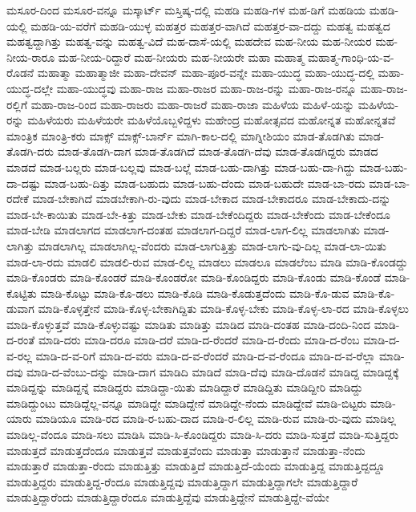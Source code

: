 {ಮಸೂರ-ದಿಂದ
ಮಸೂರ-ವನ್ನೂ
ಮಸ್ಕಾರ್ಟ್
ಮಸ್ತಿಷ್ಕ-ದಲ್ಲಿ
ಮಹಡಿ
ಮಹಡಿ-ಗಳ
ಮಹ-ಡಿಗೆ
ಮಹಡಿಯ
ಮಹಡಿ-ಯಲ್ಲಿ
ಮಹಡಿ-ಯ-ವರೆಗೆ
ಮಹಡಿ-ಯುಳ್ಳ
ಮಹತ್ತರ
ಮಹತ್ತರ-ವಾಗಿದೆ
ಮಹತ್ತರ-ವಾ-ದದ್ದು
ಮಹತ್ವ
ಮಹತ್ವದ
ಮಹತ್ವದ್ದಾಗಿತ್ತು
ಮಹತ್ವ-ವನ್ನು
ಮಹತ್ವ-ವಿದೆ
ಮಹ-ದಾಸೆ-ಯಲ್ಲಿ
ಮಹದೇವ
ಮಹ-ನೀಯ
ಮಹ-ನೀಯರ
ಮಹ-ನೀಯ-ರಾರೂ
ಮಹ-ನೀಯ-ರಿದ್ದಾರೆ
ಮಹ-ನೀಯರು
ಮಹ-ನೀಯರೇ
ಮಹಾ
ಮಹಾತ್ಮ
ಮಹಾತ್ಮ-ಗಾಂಧಿ-ಯ-ವ-ರೊಡನೆ
ಮಹಾತ್ಮಾ
ಮಹಾತ್ಮಾಜೀ
ಮಹಾ-ದೇವನ್
ಮಹಾ-ಪೂರ-ವನ್ನೇ
ಮಹಾ-ಯುದ್ಧ
ಮಹಾ-ಯುದ್ಧ-ದಲ್ಲಿ
ಮಹಾ-ಯುದ್ಧ-ದಲ್ಲೇ
ಮಹಾ-ಯುದ್ಧವು
ಮಹಾ-ರಾಜ
ಮಹಾ-ರಾಜರ
ಮಹಾ-ರಾಜ-ರನ್ನು
ಮಹಾ-ರಾಜ-ರನ್ನೂ
ಮಹಾ-ರಾಜ-ರಲ್ಲಿಗೆ
ಮಹಾ-ರಾಜ-ರಿಂದ
ಮಹಾ-ರಾಜರು
ಮಹಾ-ರಾಜರೆ
ಮಹಾ-ರಾಜಾ
ಮಹಿಳೆಯ
ಮಹಿಳೆ-ಯನ್ನು
ಮಹಿಳೆಯ-ರನ್ನು
ಮಹಿಳೆಯರು
ಮಹಿಳೆಯರೇ
ಮಹಿಳೆಯೊಬ್ಬಳಿದ್ದಳು
ಮಹೇಂದ್ರ
ಮಹೋತ್ಸವದ
ಮಹೋನ್ನತ
ಮಹೋನ್ನತವೆ
ಮಾಂತ್ರಿಕ
ಮಾಂತ್ರಿ-ಕರು
ಮಾಕ್ಸ್
ಮಾಕ್ಸ್-ಬಾರ್ನ್
ಮಾಗಿ-ಕಾಲ-ದಲ್ಲಿ
ಮಾಗ್ನೀಶಿಯಂ
ಮಾಡ-ತೊಡಗಿತು
ಮಾಡ-ತೊಡಗಿ-ದರು
ಮಾಡ-ತೊಡಗಿ-ದಾಗ
ಮಾಡ-ತೊಡಗಿದೆ
ಮಾಡ-ತೊಡಗಿ-ದೆವು
ಮಾಡ-ತೊಡಗಿದ್ದರು
ಮಾಡದ
ಮಾಡದೆ
ಮಾಡ-ಬಲ್ಲರು
ಮಾಡ-ಬಲ್ಲವು
ಮಾಡ-ಬಲ್ಲೆ
ಮಾಡ-ಬಹು-ದಾಗಿತ್ತು
ಮಾಡ-ಬಹು-ದಾ-ಗಿದ್ದು
ಮಾಡ-ಬಹು-ದಾ-ದಷ್ಟು
ಮಾಡ-ಬಹು-ದಿತ್ತು
ಮಾಡ-ಬಹುದು
ಮಾಡ-ಬಹು-ದೆಂದು
ಮಾಡ-ಬಹುದೇ
ಮಾಡ-ಬಾ-ರದು
ಮಾಡ-ಬಾ-ರದೇಕೆ
ಮಾಡ-ಬೇಕಾಗಿದೆ
ಮಾಡಬೇಕಾಗಿ-ರು-ವುದು
ಮಾಡ-ಬೇಕಾದ
ಮಾಡ-ಬೇಕಾದರೂ
ಮಾಡ-ಬೇಕಾದು-ದನ್ನು
ಮಾಡ-ಬೇ-ಕಾಯಿತು
ಮಾಡ-ಬೇ-ಕಿತ್ತು
ಮಾಡ-ಬೇಕು
ಮಾಡ-ಬೇಕೆಂದಿದ್ದರು
ಮಾಡ-ಬೇಕೆಂದು
ಮಾಡ-ಬೇಕೆಂದೂ
ಮಾಡ-ಬೇಡಿ
ಮಾಡಲಾಗದ
ಮಾಡಲಾಗ-ದಂತಹ
ಮಾಡಲಾಗ-ದಿದ್ದರೆ
ಮಾಡ-ಲಾಗ-ಲಿಲ್ಲ
ಮಾಡಲಾಗಿತು
ಮಾಡ-ಲಾಗಿತ್ತು
ಮಾಡಲಾಗಿಲ್ಲ
ಮಾಡಲಾಗಿಲ್ಲ-ವೆಂದರು
ಮಾಡ-ಲಾಗುತ್ತಿತ್ತು
ಮಾಡ-ಲಾಗು-ವು-ದಿಲ್ಲ
ಮಾಡ-ಲಾ-ಯಿತು
ಮಾಡ-ಲಾ-ರದು
ಮಾಡಲಿ
ಮಾಡಲಿ-ರುವ
ಮಾಡ-ಲಿಲ್ಲ
ಮಾಡಲು
ಮಾಡಲೂ
ಮಾಡಲೆಂಬ
ಮಾಡಿ
ಮಾಡಿ-ಕೊಂಡದ್ದು
ಮಾಡಿ-ಕೊಂಡರು
ಮಾಡಿ-ಕೊಂಡರೆ
ಮಾಡಿ-ಕೊಂಡರೋ
ಮಾಡಿ-ಕೊಂಡಿದ್ದರು
ಮಾಡಿ-ಕೊಂಡು
ಮಾಡಿ-ಕೊಂಡೆ
ಮಾಡಿ-ಕೊಟ್ಟಿತು
ಮಾಡಿ-ಕೊಟ್ಟು
ಮಾಡಿ-ಕೊ-ಡಲು
ಮಾಡಿ-ಕೊಡಿ
ಮಾಡಿ-ಕೊಡುತ್ತದೆಂದು
ಮಾಡಿ-ಕೊ-ಡುವ
ಮಾಡಿ-ಕೊ-ಡುವಾಗ
ಮಾಡಿ-ಕೊಳ್ಳತ್ತೇನೆ
ಮಾಡಿ-ಕೊಳ್ಳ-ಬೇಕಾಗಿದ್ದಿತು
ಮಾಡಿ-ಕೊಳ್ಳ-ಬೇಕು
ಮಾಡಿ-ಕೊಳ್ಳ-ಲಾ-ರದ
ಮಾಡಿ-ಕೊಳ್ಳಲು
ಮಾಡಿ-ಕೊಳ್ಳುತ್ತವೆ
ಮಾಡಿ-ಕೊಳ್ಳುವಷ್ಟು
ಮಾಡಿತು
ಮಾಡಿತ್ತು
ಮಾಡಿದ
ಮಾಡಿ-ದಂತಹ
ಮಾಡಿ-ದಂದಿ-ನಿಂದ
ಮಾಡಿ-ದ-ರಂತೆ
ಮಾಡಿ-ದರು
ಮಾಡಿ-ದರೂ
ಮಾಡಿ-ದರೆ
ಮಾಡಿ-ದ-ರೆಂದರೆ
ಮಾಡಿ-ದ-ರೆಂದು
ಮಾಡಿ-ದ-ರೆಂಬ
ಮಾಡಿ-ದ-ವ-ರಲ್ಲ
ಮಾಡಿ-ದ-ವ-ರಿಗೆ
ಮಾಡಿ-ದ-ವರು
ಮಾಡಿ-ದ-ವ-ರೆಂದರೆ
ಮಾಡಿ-ದ-ವ-ರೆಂದೂ
ಮಾಡಿ-ದ-ವ-ರೆಲ್ಲಾ
ಮಾಡಿ-ದವು
ಮಾಡಿ-ದ-ವೆಂಬು-ದನ್ನು
ಮಾಡಿ-ದಾಗ
ಮಾಡಿದಿ
ಮಾಡಿದೆ
ಮಾಡಿ-ದೆವು
ಮಾಡಿ-ದೊಡನೆ
ಮಾಡಿದ್ದ
ಮಾಡಿದ್ದಕ್ಕೆ
ಮಾಡಿದ್ದನ್ನು
ಮಾಡಿದ್ದನ್ನೆ
ಮಾಡಿದ್ದರು
ಮಾಡಿದ್ದಾ-ಯಿತು
ಮಾಡಿದ್ದಾರೆ
ಮಾಡಿದ್ದಿತು
ಮಾಡಿದ್ದೀರಿ
ಮಾಡಿದ್ದು
ಮಾಡಿದ್ದುಂಟು
ಮಾಡಿದ್ದೆಲ್ಲ-ವನ್ನೂ
ಮಾಡಿದ್ದೇ
ಮಾಡಿದ್ದೇನೆ
ಮಾಡಿದ್ದೇ-ನೆಂದು
ಮಾಡಿದ್ದೇವೆ
ಮಾಡಿ-ಬಿಟ್ಟರು
ಮಾಡಿ-ಯಾರು
ಮಾಡಿಯೂ
ಮಾಡಿ-ರದ
ಮಾಡಿ-ರ-ಬಹು-ದಾದ
ಮಾಡಿ-ರ-ಲಿಲ್ಲ
ಮಾಡಿ-ರುವ
ಮಾಡಿ-ರು-ವುದು
ಮಾಡಿಲ್ಲ
ಮಾಡಿಲ್ಲ-ವೆಂದೂ
ಮಾಡಿ-ಸಲು
ಮಾಡಿಸಿ
ಮಾಡಿ-ಸಿ-ಕೊಂಡಿದ್ದರು
ಮಾಡಿ-ಸಿ-ದರು
ಮಾಡಿ-ಸುತ್ತದೆ
ಮಾಡಿ-ಸುತ್ತಿದ್ದರು
ಮಾಡುತ್ತದೆ
ಮಾಡುತ್ತದೆಂದೂ
ಮಾಡುತ್ತವೆ
ಮಾಡುತ್ತವೆಂದು
ಮಾಡುತ್ತಾ
ಮಾಡುತ್ತಾನೆ
ಮಾಡುತ್ತಾ-ನೆಂದು
ಮಾಡುತ್ತಾರೆ
ಮಾಡುತ್ತಾ-ರೆಂದು
ಮಾಡುತ್ತಿತ್ತು
ಮಾಡುತ್ತಿದೆ
ಮಾಡುತ್ತಿದೆ-ಯೆಂದು
ಮಾಡುತ್ತಿದ್ದ
ಮಾಡುತ್ತಿದ್ದದ್ದೂ
ಮಾಡುತ್ತಿದ್ದರು
ಮಾಡುತ್ತಿದ್ದ-ರೆಂದೂ
ಮಾಡುತ್ತಿದ್ದವು
ಮಾಡುತ್ತಿದ್ದಾಗ
ಮಾಡುತ್ತಿದ್ದಾಗಲೇ
ಮಾಡುತ್ತಿದ್ದಾರೆ
ಮಾಡುತ್ತಿದ್ದಾರೆಂದು
ಮಾಡುತ್ತಿದ್ದಾರೆಂದೂ
ಮಾಡುತ್ತಿದ್ದೆವು
ಮಾಡುತ್ತಿದ್ದೇನೆ
ಮಾಡುತ್ತಿದ್ದೇ-ವೆಯೇ
}
